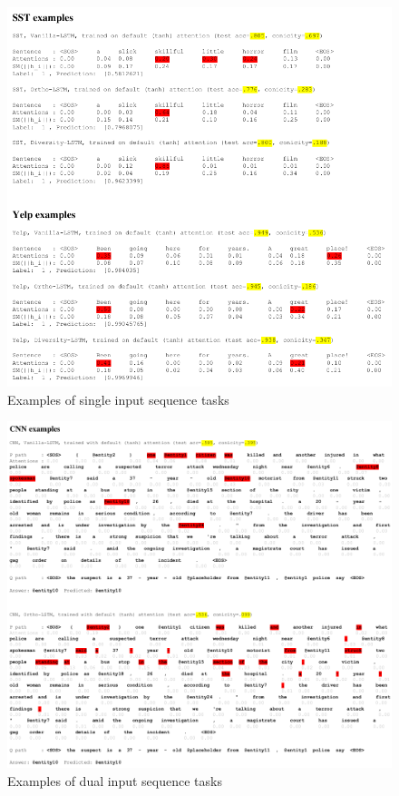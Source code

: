 \begin{figure}[h]
\centering
\includegraphics[width=1.0\textwidth,left]{./figures/BCexamples.pdf}
\caption{Examples of single input sequence tasks}
\label{fig:data_examples_1}
\end{figure}

\newpage

\begin{figure}[h]
\centering
\includegraphics[width=1.0\textwidth,left]{./figures/QAexamples.pdf}
\caption{Examples of dual input sequence tasks}
\label{fig:data_examples_2}
\end{figure}
